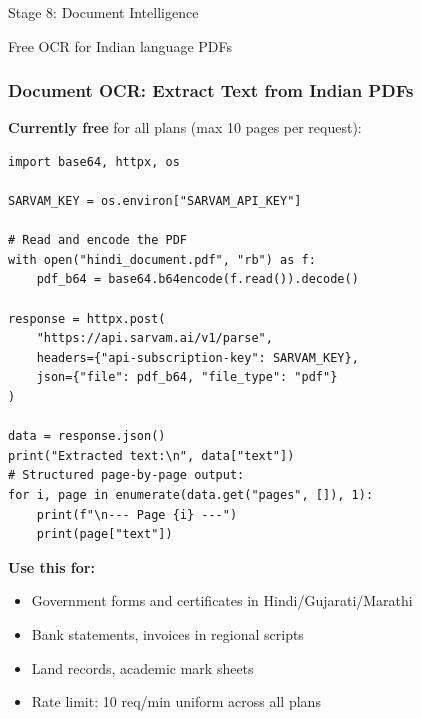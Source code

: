 \begin{frame}[fragile]\frametitle{}
\begin{center}
{\Large Stage 8: Document Intelligence}

{\normalsize Free OCR for Indian language PDFs}
\end{center}
\end{frame}

\begin{frame}[fragile]\frametitle{Document OCR: Extract Text from Indian PDFs}
\textbf{Currently free} for all plans (max 10 pages per request):
\begin{lstlisting}
import base64, httpx, os

SARVAM_KEY = os.environ["SARVAM_API_KEY"]

# Read and encode the PDF
with open("hindi_document.pdf", "rb") as f:
    pdf_b64 = base64.b64encode(f.read()).decode()

response = httpx.post(
    "https://api.sarvam.ai/v1/parse",
    headers={"api-subscription-key": SARVAM_KEY},
    json={"file": pdf_b64, "file_type": "pdf"}
)

data = response.json()
print("Extracted text:\n", data["text"])
# Structured page-by-page output:
for i, page in enumerate(data.get("pages", []), 1):
    print(f"\n--- Page {i} ---")
    print(page["text"])
\end{lstlisting}

\textbf{Use this for:}
  \begin{itemize}
    \item Government forms and certificates in Hindi/Gujarati/Marathi
    \item Bank statements, invoices in regional scripts
    \item Land records, academic mark sheets
    \item Rate limit: 10 req/min uniform across all plans
  \end{itemize}
\end{frame}

